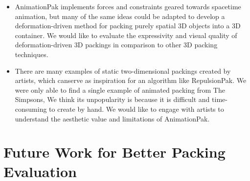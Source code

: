 \begin{itemize}
\item AnimationPak implements forces and constraints geared towards 
	spacetime animation, but many of the same ideas could be adapted
	to develop a deformation-driven method for packing purely spatial
	3D objects into a 3D container.  We would like to evaluate the
	expressivity and visual quality of deformation-driven 3D packings 
	in comparison to other 3D packing techniques.

\item There are many examples of static two-dimensional packings
	created by artists, which canserve as inspiration for an algorithm like RepulsionPak.  
	We were only able to find a single example of animated packing from The Simpsons, 
	We think its unpopularity is because it is difficult and time-consuming to create by hand.
	We would like 	to engage with artists to understand the aesthetic value and limitations
	of AnimationPak.

\end{itemize}

\section{Future Work for Better Packing Evaluation}

